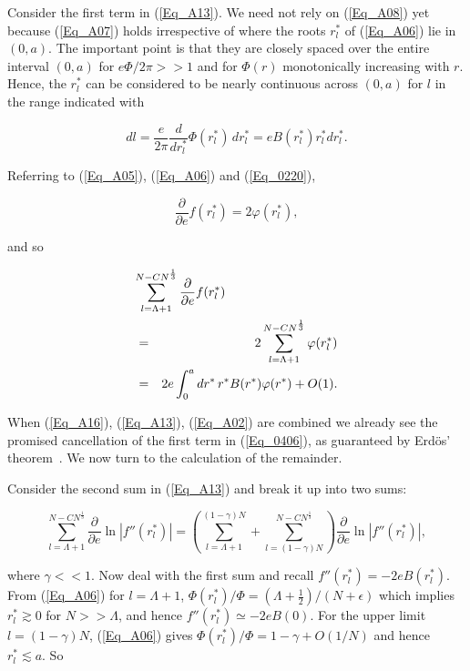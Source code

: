 \documentclass[a4paper,twocolumn,showpacs,preprintnumbers,amsmath,amssymb]{revtex4}
\newcommand{\half}{\frac{1}{2}}
\newcommand{\odo}[1]{\ensuremath{\frac{d}{d #1}}}
\newcommand{\pdo}[1]{\ensuremath{\frac{\partial }
        {\partial #1 }}}
\begin{document}
\noindent
Consider the first term in (\ref{Eq_A13}). We need not rely on
(\ref{Eq_A08}) yet because (\ref{Eq_A07}) holds irrespective of where
the roots $r^{*}_l$ of (\ref{Eq_A06}) lie in $(0,a)$. The important
point is that they are closely spaced over the entire interval $(0,a)$
for $e\Phi / 2\pi >> 1$ and for $\Phi(r)$ monotonically increasing
with $r$. Hence, the $r^{*}_l$ can be considered to be nearly
continuous across $(0,a)$ for $l$ in the range indicated with

\begin{equation}
\label{Eq_A14}
dl = \frac{e}{2\pi} \odo{r^{*}_l} \Phi(r^{*}_l) \, dr^{*}_l
   = eB(r^{*}_l) r^{*}_l dr^{*}_l.
\end{equation}

\noindent
Referring to (\ref{Eq_A05}), (\ref{Eq_A06}) and (\ref{Eq_0220}),

\begin{equation}
\label{Eq_A15}
\pdo{e}f(r^{*}_l) = 2 \varphi(r^{*}_l),
\end{equation}

\noindent
and so

\begin{eqnarray}
\nonumber
\lefteqn{\sum^{N - CN^{\frac{1}{3}}}_{l=\Lambda + 1} \pdo{e} f(r^{*}_l)}\\
\nonumber
  &=& 2 \sum^{N - CN^{\frac{1}{3}}}_{l=\Lambda + 1} \varphi(r^{*}_l)\\
\label{Eq_A16}
  &=& 2e \int^a_0 dr^{*} \, r^{*} B(r^{*}) \varphi(r^{*}) + O(1).
\end{eqnarray}

\noindent
When (\ref{Eq_A16}), (\ref{Eq_A13}), (\ref{Eq_A02}) are combined we
already see the promised cancellation of the first term in
(\ref{Eq_0406}), as guaranteed by Erd\"{o}s' theorem~\cite{Erdos93}. We
now turn to the calculation of the remainder.

Consider the second sum in (\ref{Eq_A13}) and break it up into two
sums:

\begin{widetext}
\begin{equation}
\label{Eq_A17}
\sum^{N-CN^{\frac{1}{3}}}_{l=\Lambda+1}
  \pdo{e} \ln|f''(r^{*}_l)|
  = \left(
  \sum^{(1 - \gamma)N}_{l=\Lambda+1}
  + \sum^{N-CN^{\frac{1}{3}}}_{l=(1-\gamma)N}
  \right)
  \pdo{e} \ln |f''(r^{*}_l)|,
\end{equation}
\end{widetext}

\noindent
where $\gamma << 1$. Now deal with the first sum and recall
$f''(r^{*}_l) = -2eB(r^{*}_l)$. From (\ref{Eq_A06}) for
$l = \Lambda + 1$,
$\Phi(r^{*}_l)/\Phi = (\Lambda + \half)/(N + \epsilon)$ which implies
$r^{*}_l \gtrsim 0$ for $N >> \Lambda$, and hence
$f''(r^{*}_l) \simeq -2eB(0)$. For the upper limit
$l = (1 - \gamma)N$, (\ref{Eq_A06}) gives
$\Phi(r^{*}_l)/\Phi = 1 - \gamma + O(1/N)$ and hence
$r^{*}_l \lesssim a$. So
\end{document}
